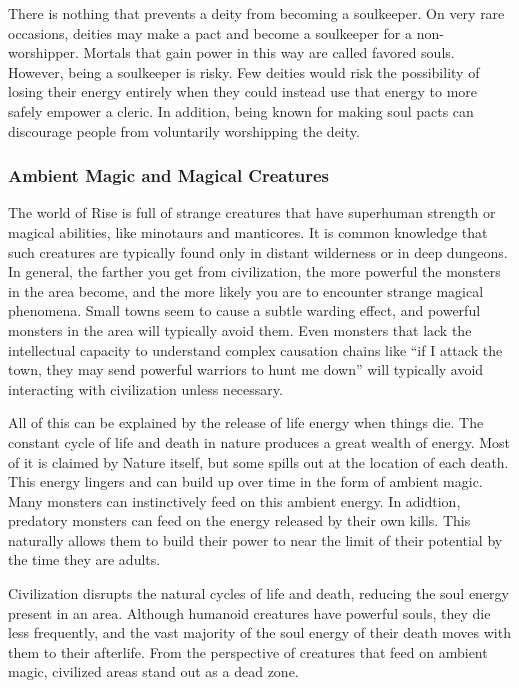      There is nothing that prevents a deity from becoming a soulkeeper.
      On very rare occasions, deities may make a pact and become a soulkeeper for a non-worshipper.
      Mortals that gain power in this way are called favored souls.
      However, being a soulkeeper is risky.
      Few deities would risk the possibility of losing their energy entirely when they could instead use that energy to more safely empower a cleric.
      In addition, being known for making soul pacts can discourage people from voluntarily worshipping the deity.

    \subsubsection{Ambient Magic and Magical Creatures}
      The world of Rise is full of strange creatures that have superhuman strength or magical abilities, like minotaurs and manticores.
      It is common knowledge that such creatures are typically found only in distant wilderness or in deep dungeons.
      In general, the farther you get from civilization, the more powerful the monsters in the area become, and the more likely you are to encounter strange magical phenomena.
      Small towns seem to cause a subtle warding effect, and powerful monsters in the area will typically avoid them.
      Even monsters that lack the intellectual capacity to understand complex causation chains like ``if I attack the town, they may send powerful warriors to hunt me down'' will typically avoid interacting with civilization unless necessary.

      All of this can be explained by the release of life energy when things die.
      The constant cycle of life and death in nature produces a great wealth of energy.
      Most of it is claimed by Nature itself, but some spills out at the location of each death.
      This energy lingers and can build up over time in the form of ambient magic.
      Many monsters can instinctively feed on this ambient energy.
      In adidtion, predatory monsters can feed on the energy released by their own kills.
      This naturally allows them to build their power to near the limit of their potential by the time they are adults.

      Civilization disrupts the natural cycles of life and death, reducing the soul energy present in an area.
      Although humanoid creatures have powerful souls, they die less frequently, and the vast majority of the soul energy of their death moves with them to their afterlife.
      From the perspective of creatures that feed on ambient magic, civilized areas stand out as a dead zone.

